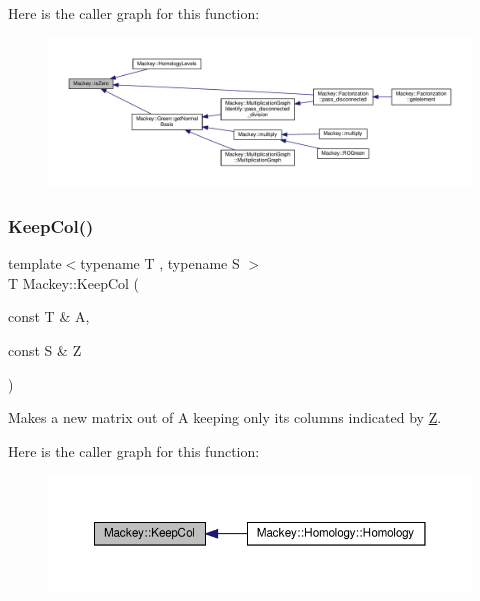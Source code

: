 Here is the caller graph for this function\+:\nopagebreak
\begin{figure}[H]
\begin{center}
\leavevmode
\includegraphics[width=350pt]{namespaceMackey_a4c3647777bc890a4649ae24b138bbb79_icgraph}
\end{center}
\end{figure}
\mbox{\label{namespaceMackey_a9a8496759bc7bb14dcaa2284ae1d0491}} 
\subsubsection{\texorpdfstring{Keep\+Col()}{KeepCol()}}
{\footnotesize\ttfamily template$<$typename T , typename S $>$ \\
T Mackey\+::\+Keep\+Col (\begin{DoxyParamCaption}\item[{const T \&}]{A,  }\item[{const S \&}]{Z }\end{DoxyParamCaption})}



Makes a new matrix out of A keeping only its columns indicated by \hyperlink{classZ}{Z}. 

Here is the caller graph for this function\+:\nopagebreak
\begin{figure}[H]
\begin{center}
\leavevmode
\includegraphics[width=350pt]{namespaceMackey_a9a8496759bc7bb14dcaa2284ae1d0491_icgraph}
\end{center}
\end{figure}
\mbox{\label{namespaceMackey_ad6870101d4fd762100a3115abc4a15db}} 
